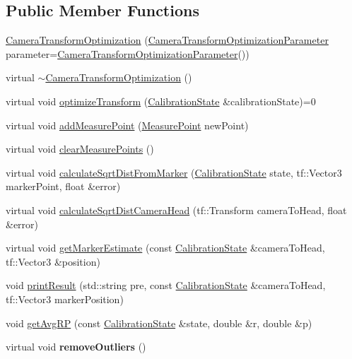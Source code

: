 \subsection*{\-Public \-Member \-Functions}
\begin{DoxyCompactItemize}
\item 
\hyperlink{classCameraTransformOptimization_a8c184b6dd5e2db624109d76ffb90c026}{\-Camera\-Transform\-Optimization} (\hyperlink{classCameraTransformOptimizationParameter}{\-Camera\-Transform\-Optimization\-Parameter} parameter=\hyperlink{classCameraTransformOptimizationParameter}{\-Camera\-Transform\-Optimization\-Parameter}())
\item 
virtual \hyperlink{classCameraTransformOptimization_a1d34a5b00c8222fac7e5939f88f55e96}{$\sim$\-Camera\-Transform\-Optimization} ()
\item 
virtual void \hyperlink{classCameraTransformOptimization_a8a4a4a09325f4bae401bad62ec7e9f02}{optimize\-Transform} (\hyperlink{classCalibrationState}{\-Calibration\-State} \&calibration\-State)=0
\item 
virtual void \hyperlink{classCameraTransformOptimization_ac1ffbf2ddfc7e7de7639e870d0745957}{add\-Measure\-Point} (\hyperlink{classCameraMeasurePoint}{\-Measure\-Point} new\-Point)
\item 
virtual void \hyperlink{classCameraTransformOptimization_a53007c5c531dd86a5facf7cbc82f477e}{clear\-Measure\-Points} ()
\item 
virtual void \hyperlink{classCameraTransformOptimization_abdd025826d3ece8861c07d91fa5cb98e}{calculate\-Sqrt\-Dist\-From\-Marker} (\hyperlink{classCalibrationState}{\-Calibration\-State} state, tf\-::\-Vector3 marker\-Point, float \&error)
\item 
virtual void \hyperlink{classCameraTransformOptimization_ae23b52f59e2f4eb5e37eca8ba0e3fc1b}{calculate\-Sqrt\-Dist\-Camera\-Head} (tf\-::\-Transform camera\-To\-Head, float \&error)
\item 
virtual void \hyperlink{classCameraTransformOptimization_a63da0977758e7a4b63f946ada33e7dd5}{get\-Marker\-Estimate} (const \hyperlink{classCalibrationState}{\-Calibration\-State} \&camera\-To\-Head, tf\-::\-Vector3 \&position)
\item 
void \hyperlink{classCameraTransformOptimization_a2ac72c140004cc3b2259ef4d2438cafb}{print\-Result} (std\-::string pre, const \hyperlink{classCalibrationState}{\-Calibration\-State} \&camera\-To\-Head, tf\-::\-Vector3 marker\-Position)
\item 
void \hyperlink{classCameraTransformOptimization_a913127f90c84a4e4505b057939280f89}{get\-Avg\-R\-P} (const \hyperlink{classCalibrationState}{\-Calibration\-State} \&state, double \&r, double \&p)
\item 
\hypertarget{classCameraTransformOptimization_af11daaf2cd5178c7fe4d0596a9f544de}{virtual void {\bfseries remove\-Outliers} ()}\label{classCameraTransformOptimization_af11daaf2cd5178c7fe4d0596a9f544de}


\end{DoxyCompactItemize}
